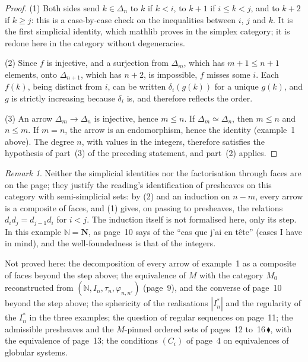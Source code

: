 \documentclass[11pt]{article}
\newcommand{\q}[1]{“#1”}
\newcommand{\fr}[1]{\textfrench{#1}}
\newcommand{\piste}[1]{\,\href{https://grothendieck.commutator.io/findings/\##1}{\textcolor{piste}{\ensuremath{\blacklozenge}}}}
\theoremstyle{plain}
\theoremstyle{definition}
\theoremstyle{remark}
\newtheorem*{remarque}{Remark}
\begin{document}
\begin{proof}
(1) Both sides send $k \in \Delta_n$ to $k$ if $k < i$, to $k + 1$ if $i \leq k < j$, and to $k + 2$ if $k \geq j$: this is a case-by-case check on the inequalities between $i$, $j$ and $k$. It is the first simplicial identity, which mathlib proves in the simplex category; it is redone here in the category without degeneracies.

(2) Since $f$ is injective, and a surjection from $\Delta_m$, which has $m + 1 \leq n + 1$ elements, onto $\Delta_{n+1}$, which has $n + 2$, is impossible, $f$ misses some $i$. Each $f(k)$, being distinct from $i$, can be written $\delta_i(g(k))$ for a unique $g(k)$, and $g$ is strictly increasing because $\delta_i$ is, and therefore reflects the order.

(3) An arrow $\Delta_m \to \Delta_n$ is injective, hence $m \leq n$. If $\Delta_m \simeq \Delta_n$, then $m \leq n$ and $n \leq m$. If $m = n$, the arrow is an endomorphism, hence the identity (example~1 above). The degree $n$, with values in the integers, therefore satisfies the hypothesis of part~(3) of the preceding statement, and part~(2) applies.
\end{proof}

\begin{remarque}
Neither the simplicial identities nor the factorisation through faces are on the page; they justify the reading's identification of presheaves on this category with semi-simplicial sets: by (2) and an induction on $n - m$, every arrow is a composite of faces, and (1) gives, on passing to presheaves, the relations $d_i d_j = d_{j-1} d_i$ for $i < j$. The induction itself is not formalised here, only its step. In this example $\mathbb N = \mathbf N$, as page~10 says of the \q{\fr{cas que j'ai en tête}} (cases I have in mind), and the well-foundedness is that of the integers.
\end{remarque}

\noindent Not proved here: the decomposition of every arrow of example~1 as a composite of faces beyond the step above; the equivalence of $M$ with the category $M_0$ reconstructed from $(\mathbb N, I_n, \tau_n, \varphi_{n,n'})$ (page~9), and the converse of page~10 beyond the step above; the sphericity of the realisations $|I_n^*|$ and the regularity of the $I_n^*$ in the three examples; the question of regular sequences on page~11; the admissible presheaves and the $M$-pinned ordered sets of pages~12 to~16\piste{104-pinned-posets-nonsingular-presheaves}, with the equivalence of page~13; the conditions $(C_i)$ of page~4 on equivalences of globular systems.
\end{document}
